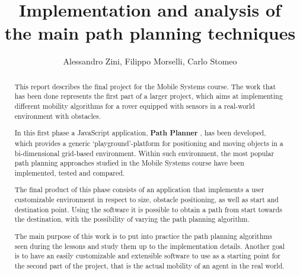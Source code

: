 \documentclass[conference]{IEEEtran}
\begin{document}
\title{Implementation and analysis of\\the main path planning techniques}

\author{
	Alessandro Zini, Filippo Morselli, Carlo Stomeo
	\\
}

\maketitle

\begin{abstract}
	This report describes the final project for the Mobile Systems course. The work that has been done represents the first part of a larger project, which aims at implementing different mobility algorithms for a rover equipped with sensors in a real-world environment with obstacles.

	In this first phase a JavaScript application, \textbf{Path Planner} \cite{Path-Planner}, has been developed, which provides a generic `playground'-platform for positioning and moving objects in a bi-dimensional grid-based environment. Within such environment, the most popular path planning approaches studied in the Mobile Systems course have been implemented, tested and compared.

	The final product of this phase consists of an application that implements a user customizable environment in respect to size, obstacle positioning, as well as start and destination point. Using the software it is possible to obtain a path from start towards the destination, with the possibility of varying the path planning algorithm.

	The main purpose of this work is to put into practice the path planning algorithms seen during the lessons and study them up to the implementation details. Another goal is to have an easily customizable and extensible software to use as a starting point for the second part of the project, that is the actual mobility of an agent in the real world.
\end{abstract}
\end{document}
